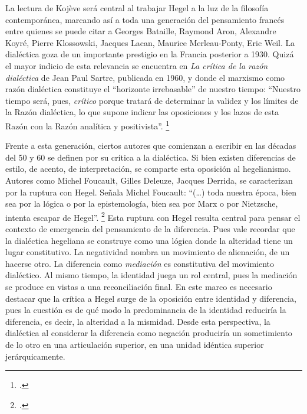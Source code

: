 La lectura de Kojève será central al trabajar Hegel a la luz de la filosofía contemporánea, marcando así a toda una generación del pensamiento francés entre quienes se puede citar a Georges Bataille, Raymond Aron, Alexandre Koyré, Pierre Klossowski, Jacques Lacan, Maurice Merleau-Ponty, Eric Weil. La dialéctica goza de un importante prestigio en la Francia posterior a 1930. Quizá el mayor indicio de esta relevancia se encuentra en \emph{La crítica de la razón dialéctica} de Jean Paul Sartre, publicada en 1960, y donde el marxismo como razón dialéctica constituye el \enquote{horizonte irrebasable} de nuestro tiempo: \enquote{Nuestro tiempo será, pues, \emph{crítico} porque tratará de determinar la validez y los límites de la Razón dialéctica, lo que supone indicar las oposiciones y los lazos de esta Razón con la Razón analítica y positivista}. \footcite[11]{@6964-SARTRE1995}

Frente a esta generación, ciertos autores que comienzan a escribir en las décadas del 50 y 60 se definen por su crítica a la dialéctica. Si bien existen diferencias de estilo, de acento, de interpretación, se comparte esta oposición al hegelianismo. Autores como Michel Foucault, Gilles Deleuze, Jacques Derrida, se caracterizan por la ruptura con Hegel. Señala Michel Foucault: \enquote{(\dots) toda nuestra época, bien sea por la lógica o por la epistemología, bien sea por Marx o por Nietzsche, intenta escapar de Hegel}. \footcite[59]{@6984-FOUCAULT1973} Esta ruptura con Hegel resulta central para pensar el contexto de emergencia del pensamiento de la diferencia. Pues vale recordar que la dialéctica hegeliana se construye como una lógica donde la alteridad tiene un lugar constitutivo. La negatividad nombra un movimiento de alienación, de un hacerse otro. La diferencia como \emph{mediación} es constitutiva del movimiento dialéctico. Al mismo tiempo, la identidad juega un rol central, pues la mediación se produce en vistas a una reconciliación final. En este marco es necesario destacar que la crítica a Hegel surge de la oposición entre identidad y diferencia, pues la cuestión es de qué modo la predominancia de la identidad reduciría la diferencia, es decir, la alteridad a la mismidad. Desde esta perspectiva, la dialéctica al considerar la diferencia como negación produciría un sometimiento de lo otro en una articulación superior, en una unidad idéntica superior jerárquicamente.

